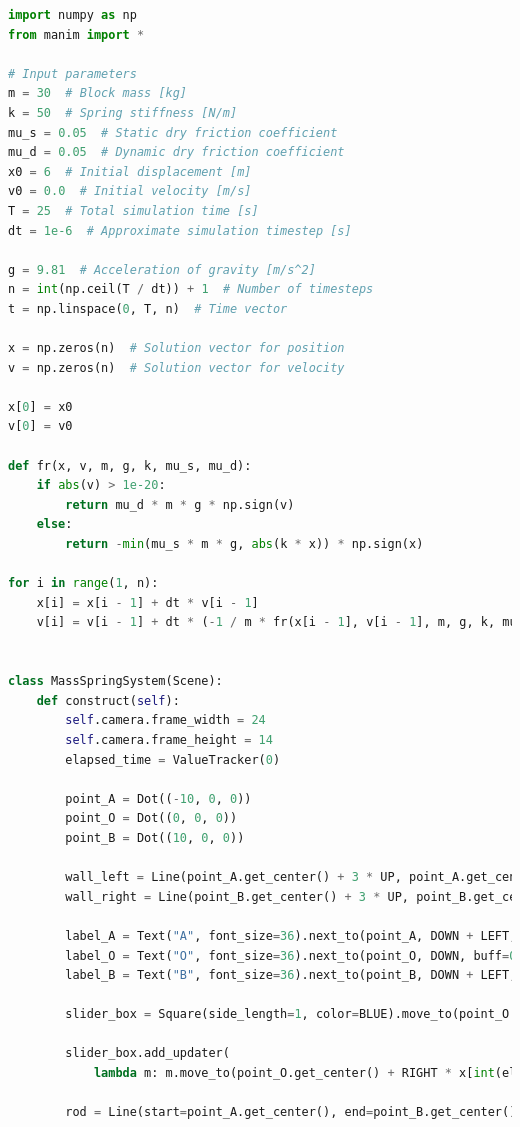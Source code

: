 \documentclass[12pt, a4paper, oneside]{report}
\begin{document}
\begin{lstlisting}[language=Python, caption=Manim Simulation Code]
import numpy as np
from manim import *

# Input parameters
m = 30  # Block mass [kg]
k = 50  # Spring stiffness [N/m]
mu_s = 0.05  # Static dry friction coefficient
mu_d = 0.05  # Dynamic dry friction coefficient
x0 = 6  # Initial displacement [m]
v0 = 0.0  # Initial velocity [m/s]
T = 25  # Total simulation time [s]
dt = 1e-6  # Approximate simulation timestep [s]

g = 9.81  # Acceleration of gravity [m/s^2]
n = int(np.ceil(T / dt)) + 1  # Number of timesteps
t = np.linspace(0, T, n)  # Time vector

x = np.zeros(n)  # Solution vector for position
v = np.zeros(n)  # Solution vector for velocity

x[0] = x0
v[0] = v0

def fr(x, v, m, g, k, mu_s, mu_d):
    if abs(v) > 1e-20:
        return mu_d * m * g * np.sign(v)
    else:
        return -min(mu_s * m * g, abs(k * x)) * np.sign(x)

for i in range(1, n):
    x[i] = x[i - 1] + dt * v[i - 1]
    v[i] = v[i - 1] + dt * (-1 / m * fr(x[i - 1], v[i - 1], m, g, k, mu_s, mu_d) - k / m * x[i - 1])


class MassSpringSystem(Scene):
    def construct(self):
        self.camera.frame_width = 24
        self.camera.frame_height = 14
        elapsed_time = ValueTracker(0)

        point_A = Dot((-10, 0, 0))
        point_O = Dot((0, 0, 0))
        point_B = Dot((10, 0, 0))

        wall_left = Line(point_A.get_center() + 3 * UP, point_A.get_center() + 3 * DOWN, color=WHITE, stroke_width=10)
        wall_right = Line(point_B.get_center() + 3 * UP, point_B.get_center() + 3 * DOWN, color=WHITE, stroke_width=10)

        label_A = Text("A", font_size=36).next_to(point_A, DOWN + LEFT, buff=0.1)
        label_O = Text("O", font_size=36).next_to(point_O, DOWN, buff=0.1)
        label_B = Text("B", font_size=36).next_to(point_B, DOWN + LEFT, buff=0.1)

        slider_box = Square(side_length=1, color=BLUE).move_to(point_O.get_center() + RIGHT * x[0])

        slider_box.add_updater(
            lambda m: m.move_to(point_O.get_center() + RIGHT * x[int(elapsed_time.get_value() / dt)]))

        rod = Line(start=point_A.get_center(), end=point_B.get_center(), color=GREY, stroke_width=20, stroke_opacity=0.8)


\end{lstlisting}
\end{document}
